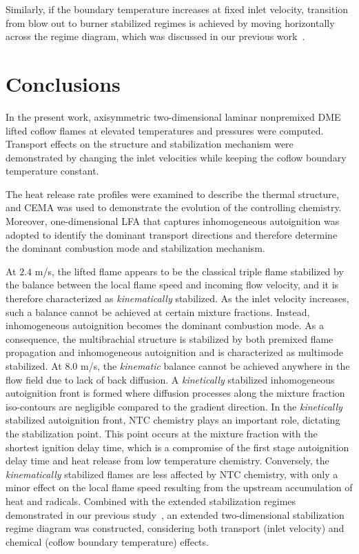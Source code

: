 \documentclass[review,3p,times]{elsarticle}
\begin{document}
Similarly, if the boundary temperature increases at fixed inlet velocity, transition from blow out to burner stabilized regimes is achieved by moving horizontally across the regime diagram, which was discussed in our previous work~\cite{deng15}.     



\section{Conclusions}

In the present work, axisymmetric two-dimensional laminar nonpremixed DME lifted coflow flames at elevated temperatures and pressures were computed.  Transport effects on the structure and stabilization mechanism were demonstrated by changing the inlet velocities while keeping the coflow boundary temperature constant.

The heat release rate profiles were examined to describe the thermal structure, and CEMA was used to demonstrate the evolution of the controlling chemistry.  Moreover, one-dimensional LFA that captures inhomogeneous autoignition was adopted to identify the dominant transport directions and therefore determine the dominant combustion mode and stabilization mechanism.

At $2.4$ m/s, the lifted flame appears to be the classical triple flame stabilized by the balance between the local flame speed and incoming flow velocity, and it is therefore characterized as \emph {kinematically} stabilized.  As the inlet velocity increases, such a balance cannot be achieved at certain mixture fractions.  Instead, inhomogeneous autoignition becomes the dominant combustion mode.  As a consequence, the multibrachial structure is stabilized by both premixed flame propagation and inhomogeneous autoignition and is characterized as multimode stabilized.  At $8.0$ m/s, the \emph{kinematic} balance cannot be achieved anywhere in the flow field due to lack of back diffusion.  A \emph{kinetically} stabilized inhomogeneous autoignition front is formed where diffusion processes along the mixture fraction iso-contours are negligible compared to the gradient direction.  In the \emph{kinetically} stabilized autoignition front, NTC chemistry plays an important role, dictating the stabilization point.  This point occurs at the mixture fraction with the shortest ignition delay time, which is a compromise of the first stage autoignition delay time and heat release from low temperature chemistry.  Conversely, the \emph{kinematically} stabilized flames are less affected by NTC chemistry, with only a minor effect on the local flame speed resulting from the upstream accumulation of heat and radicals.  Combined with the extended stabilization regimes demonstrated in our previous study~\cite{deng15}, an extended two-dimensional stabilization regime diagram was constructed, considering both transport (inlet velocity) and chemical (coflow boundary temperature) effects.  
\end{document}
